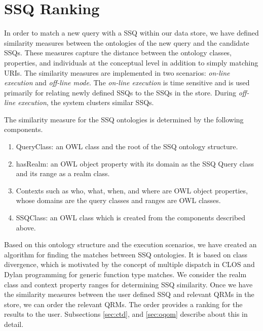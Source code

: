 \section{SSQ Ranking}
\label{sec:ssq}
In order to match a new query with a SSQ within our data store, we
have defined similarity measures between the ontologies of the new
query and the candidate SSQs. These measures capture the distance
between the ontology classes, properties, and individuals at the
conceptual level in addition to simply matching URIs. The similarity
measures are implemented in two scenarios: \textit{on-line execution}
and \textit{off-line mode}. The \textit{on-line execution} is time
sensitive and is used primarily for relating newly defined SSQs to the
SSQs in the store. During \textit{off-line execution}, the system
clusters similar SSQs.

The similarity measure for the SSQ ontologies is determined by the
following components.
\begin{enumerate}
    \item QueryClass: an OWL class and the root of the SSQ ontology
      structure.
    \item hasRealm: an OWL object property with its domain as the SSQ
      Query class and its range as a realm class.
    \item Contexts such as who, what, when, and where are OWL object
      properties, whose domains are the query classes and ranges are
      OWL classes.
    \item SSQClass: an OWL class which is created from the components
      described above.
\end{enumerate}
Based on this ontology structure and the execution scenarios, we have
created an algorithm for finding the matches between SSQ
ontologies. It is based on class divergence, which is motivated by the
concept of multiple dispatch in CLOS \cite{95411} and Dylan
programming \cite{DBLP:conf/oopsla/BarrettCHMPW96} for generic
function type matches. We consider the realm class and context
property ranges for determining SSQ similarity. Once we have the similarity measures between the user defined SSQ and relevant QRMs in the store, we can order the relevant QRMs. The order provides a ranking for the results to the user. Subsections \ref{sec:ctd}, and \ref{sec:oqom} describe about this in detail.


